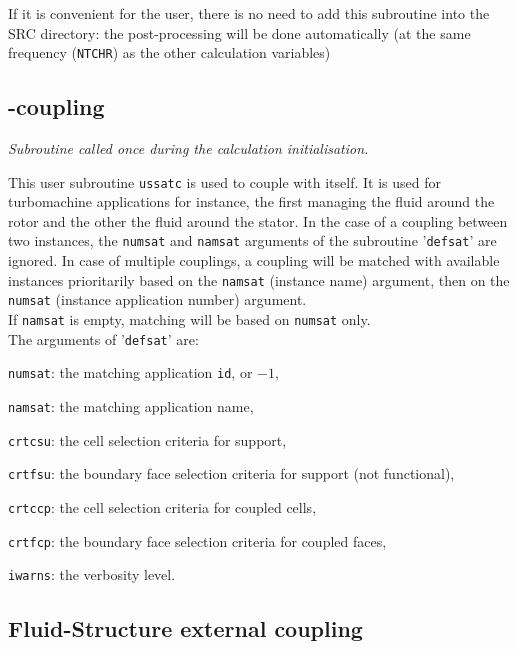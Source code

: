 {{{If it is convenient for the user, there is no need to add this subroutine into the
 SRC directory: the post-processing will be done automatically (at the same frequency
 (\texttt{NTCHR}) as the other calculation variables)


\subsection{\CS-\CS coupling}

\noindent
\textit{Subroutine called once during the calculation initialisation.}

This user subroutine \texttt{ussatc} is used to couple \CS with itself.
 It is used for turbomachine applications for instance, the first \CS managing
 the fluid around the rotor and the other the fluid around the stator.
In the case of a coupling between two \CS instances, the \texttt{numsat}
 and \texttt{namsat} arguments of the subroutine '\texttt{defsat}' are ignored.
 In case of multiple couplings, a coupling will be matched with available \CS
 instances prioritarily based on the \texttt{namsat} (\CS instance name) argument,
 then on the \texttt{numsat} (\CS instance application number) argument.\\
If \texttt{namsat} is empty, matching will be based on \texttt{numsat} only.\\
The arguments of '\texttt{defsat}' are:
\begin{list}{-}{}
\item \texttt{numsat}: the matching \CS application \texttt{id}, or $-1$,
\item \texttt{namsat}: the matching \CS application name,
\item \texttt{crtcsu}: the cell selection criteria for support,
\item \texttt{crtfsu}: the boundary face selection criteria for support (not functional),
\item \texttt{crtccp}: the cell selection criteria for coupled cells,
\item \texttt{crtfcp}: the boundary face selection criteria for coupled faces,
\item \texttt{iwarns}: the verbosity level.
\end{list}


\subsection{Fluid-Structure external coupling}

}}}
